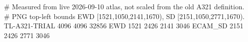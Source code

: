 # Measured from live 2026-09-10 atlas, not scaled from the old A321 definition.
# PNG top-left bounds EWD [1521,1050,2141,1670), SD [2151,1050,2771,1670).
TL-A321-TRIAL 4096 4096 32856
EWD 1521 2426 2141 3046
ECAM_SD 2151 2426 2771 3046

